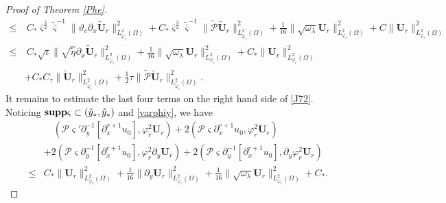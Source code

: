 \documentclass[10pt,a4paper]{amsart}
\begin{document}
\begin{proof}[Proof of Theorem \ref{Phe}]
\begin{align}
\leq&~C_{*}\bar{\varsigma}^{\frac{3}{2}}\tilde{\bar{\varsigma}}^{-1}
           \|\vartheta_{c}\partial_{x}\tilde{\mathbf{U}}_{r}\|_{L_{\tilde{\varphi}_{r}}^{2}(\Omega)}^{2}
     +C_{*}\bar{\varsigma}^{\frac{3}{2}}\tilde{\bar{\varsigma}}^{-1}\|\tilde{\mathcal{P}}\tilde{\mathbf{U}}_{r}\|_{L_{\tilde{\varphi}_{r}}^{2}(\Omega)}^{2}
     +\frac{1}{16}\|\sqrt{\omega_{\lambda}}\mathbf{U}_{r}\|_{L_{\varphi_{r}}^{2}(\Omega)}^{2}
     +C\|\mathbf{U}_{r}\|_{L_{\varphi_{r}}^{2}(\Omega)}^{2}\nonumber\\
\leq&~C_{*}\sqrt{\iota}\|\sqrt{\tilde{\eta}}\partial_{x}\tilde{\mathbf{U}}_{r}\|_{L_{\tilde{\varphi}_{r}}^{2}(\Omega)}^{2}
     +\frac{1}{16}\|\sqrt{\omega_{\lambda}}\mathbf{U}_{r}\|_{L_{\varphi_{r}}^{2}(\Omega)}^{2}
     +C_{*}\|\mathbf{U}_{r}\|_{L_{\varphi_{r}}^{2}(\Omega)}^{2}\nonumber\\
    &+C_{*}C_{\tau}\|\tilde{\mathbf{U}}_{r}\|_{L_{\tilde{\varphi}_{r}}^{2}(\Omega)}^{2}
     +\frac{1}{2}\tau\|\tilde{\mathcal{P}}\tilde{\mathbf{U}}_{r}\|_{L_{\tilde{\varphi}_{r}}^{2}(\Omega)}^{2}.\nonumber
\end{align}
It remains to estimate the last four terms on the right hand side of \eqref{J72}. Noticing ${\bf supp}\varsigma \subset(\check{y}_{*},\hat{y}_{*})$ and \eqref{varphiy}, we have
\begin{align}\label{J725}
&\quad(\mathcal{P}\varsigma'\partial_{y}^{-1}[\partial_{x}^{r+1}u_{0}],\varphi_{r}^{2}\mathbf{U}_{r})
+2(\mathcal{P}\varsigma\partial_{x}^{r+1}u_{0},\varphi_{r}^{2}\mathbf{U}_{r})\\
&+2(\mathcal{P}\varsigma\partial_{y}^{-1}[\partial_{x}^{r+1}u_{0}],\varphi_{r}^{2}\partial_{y}\mathbf{U}_{r})
+2(\mathcal{P}\varsigma\partial_{y}^{-1}[\partial_{x}^{r+1}u_{0}],\partial_{y}\varphi_{r}^{2}\mathbf{U}_{r})\nonumber\\
\leq& C_{*}\|\mathbf{U}_{r}\|_{L_{\varphi_{r}}^{2}(\Omega)}^{2}
    +\frac{1}{16}\|\partial_{y}\mathbf{U}_{r}\|_{L_{\varphi_{r}}^{2}(\Omega)}^{2}
    +\frac{1}{16}\|\sqrt{\omega_{\lambda}}\mathbf{U}_{r}\|_{L_{\varphi_{r}}^{2}(\Omega)}^{2}
    +C_{*}.\nonumber
\end{align}


\end{proof}
\end{document}

